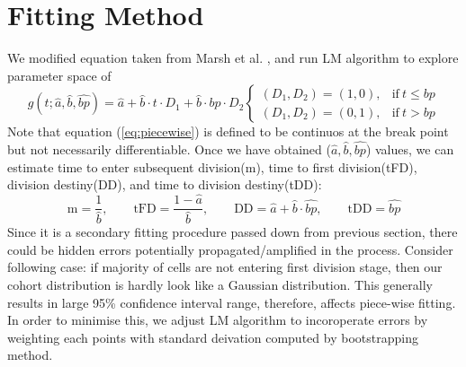 \documentclass{article}
\newcommand{\enterProblemHeader}[1]{
}
\newcommand{\exitProblemHeader}[1]{
}
\newcounter{homeworkProblemCounter} %
\newcommand{\homeworkProblemName}{}
\newenvironment{homeworkProblem}[1][Problem \arabic{homeworkProblemCounter}]{ %
\stepcounter{homeworkProblemCounter} %
\renewcommand{\homeworkProblemName}{#1} %
\section{\homeworkProblemName} %
\enterProblemHeader{\homeworkProblemName} %
}{
\exitProblemHeader{\homeworkProblemName} %
}
\begin{document}
\begin{homeworkProblem}[Fitting Method]
We modified equation taken from Marsh et al. \cite{Marsh}, and run LM algorithm to explore parameter space of
\begin{equation}
    \label{eq:piecewise}
    g(t;\hat{a},\hat{b},\hat{bp}) = \hat{a} + \hat{b}\cdot t \cdot D_1 + \hat{b} \cdot \hat{bp} \cdot D_2
    \begin{cases}
        (D_1, D_2) = (1, 0), & \mathrm{if} \ t \leq bp \\
        (D_1, D_2) = (0, 1), & \mathrm{if} \ t > bp
    \end{cases}
\end{equation}
Note that equation (\ref{eq:piecewise}) is defined to be continuos at the break point but not necessarily differentiable. Once we have obtained ($\hat{a}, \hat{b}, \hat{bp}$) values, we can estimate time to enter subsequent division(m), time to first division(tFD), division destiny(DD), and time to division destiny(tDD):
\begin{equation}
    \mathrm{m} = \frac{1}{\hat{b}}, \qquad
    \mathrm{tFD} = \frac{1 - \hat{a}}{\hat{b}}, \qquad
    \mathrm{DD} = \hat{a} + \hat{b}\cdot \hat{bp}, \qquad
    \mathrm{tDD} = \hat{bp}
    \label{eq:piecewise_params}
\end{equation}
Since it is a secondary fitting procedure passed down from previous section, there could be hidden errors potentially propagated/amplified in the process. Consider following case: if majority of cells are not entering first division stage, then our cohort distribution is hardly look like a Gaussian distribution. This generally results in large 95\% confidence interval range, therefore, affects piece-wise fitting. In order to minimise this, we adjust LM algorithm to incoroperate errors by weighting each points with standard deivation computed by bootstrapping method.
\end{homeworkProblem}
\end{document}
